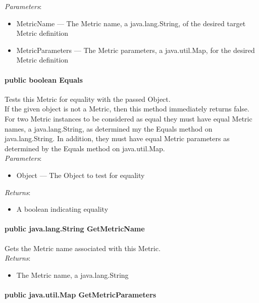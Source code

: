 \documentclass[$Date: 2003/06/26 19:29:31 $]{glabarticle}
\begin{document}
\textit{Parameters}:
\begin{itemize}
\item[] MetricName --- The Metric name, a java.lang.String, of the desired target Metric definition
\item[] MetricParameters --- The Metric parameters, a java.util.Map, for the desired Metric definition
\end{itemize}

\paragraph{public boolean Equals}

Tests this Metric for equality with the passed Object. \\

 If the given object is not a Metric, then this method immediately  returns false. \\

For two Metric instances to be considered as equal they must have equal Metric names, a java.lang.String, as
determined my the Equals method on java.lang.String. In addition, they must have equal Metric parameters as
determined by the Equals method on java.util.Map. \\

\textit{Parameters}:
\begin{itemize}
\item[] Object --- The Object to test for equality 
\end{itemize}

\textit{Returns}:
\begin{itemize}
\item[] A boolean indicating equality
\end{itemize}
 
\paragraph{public java.lang.String GetMetricName}

Gets the Metric name associated with this Metric. \\

\textit{Returns}:
\begin{itemize}
\item[] The Metric name, a java.lang.String
\end{itemize}

\paragraph{public java.util.Map GetMetricParameters}
\end{document}

